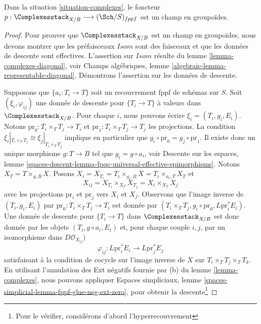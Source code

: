 \begin{lemma}
\label{lemma-complexes-stack}
Dans la situation \ref{situation-complexes}, le foncteur
$p : \Complexesstack_{X/B} \longrightarrow (\Sch/S)_{fppf}$
est un champ en groupoïdes.
\end{lemma}

\begin{proof}
Pour prouver que $\Complexesstack_{X/B}$ est un champ en groupoïdes, nous
devons montrer que les préfaisceaux $\mathit{Isom}$ sont des faisceaux et que
les données de descente sont effectives. L'assertion sur $\mathit{Isom}$
résulte du lemme \ref{lemma-complexes-diagonal}, voir
Champs algébriques, lemme \ref{algebraic-lemma-representable-diagonal}.
Démontrons l'assertion sur les données de descente.

\medskip\noindent
Supposons que $\{a_i : T_i \to T\}$ soit un recouvrement fppf de schémas sur
$S$. Soit $(\xi_i, \varphi_{ij})$ une donnée de descente pour
$\{T_i \to T\}$ à valeurs dans $\Complexesstack_{X/B}$.
Pour chaque $i$, nous pouvons écrire $\xi_i = (T_i, g_i, E_i)$.
Notons $\text{pr}_0 : T_i \times_T T_j \to T_i$ et
$\text{pr}_1 : T_i \times_T T_j \to T_j$ les projections.
La condition
$\xi_i|_{T_i \times_T T_j} \cong \xi_j|_{T_i \times_T T_j}$ implique en
particulier que $g_i \circ \text{pr}_0 = g_j \circ \text{pr}_1$.
Il existe donc un unique morphisme $g : T \to B$ tel que
$g_i = g \circ a_i$, voir
Descente sur les espaces, lemme
\ref{spaces-descent-lemma-fpqc-universal-effective-epimorphisms}.
Notons $X_T = T \times_{g, B} X$. Posons
$X_i = X_{T_i} = T_i \times_{g_i, B} X = T_i \times_{a_i, T} X_T$ et
$$
X_{ij} = X_{T_i} \times_{X_T} X_{T_j} = X_i \times_{X_T} X_j
$$
avec les projections $\text{pr}_i$ et $\text{pr}_j$ vers $X_i$ et $X_j$.
Observons que l'image inverse de $(T_i, g_i, E_i)$ par
$\text{pr}_0 : T_i \times_T T_j \to T_i$ est donnée par
$(T_i \times_T T_j, g_i \circ \text{pr}_0, L\text{pr}_i^*E_i)$.
Une donnée de descente pour $\{T_i \to T\}$ dans $\Complexesstack_{X/B}$ est
donc donnée par les objets $(T_i, g \circ a_i, E_i)$ et, pour chaque couple
$i, j$, par un isomorphisme dans $D\mathcal{O}_{X_{ij}})$
$$
\varphi_{ij} :
L\text{pr}_i^*E_i \longrightarrow L\text{pr}_j^*E_j
$$
satisfaisant à la condition de cocycle sur l'image inverse de $X$ sur
$T_i \times_T T_j \times_T T_k$.
En utilisant l'annulation des Ext négatifs fournie par (b) du
lemme \ref{lemma-complexes}, nous pouvons appliquer
Espaces simpliciaux, lemme
\ref{spaces-simplicial-lemma-fppf-glue-neg-ext-zero}, pour obtenir la
descente\footnote{Pour le vérifier, considérons d'abord l'hyperrecouvrement
}
\end{proof}
